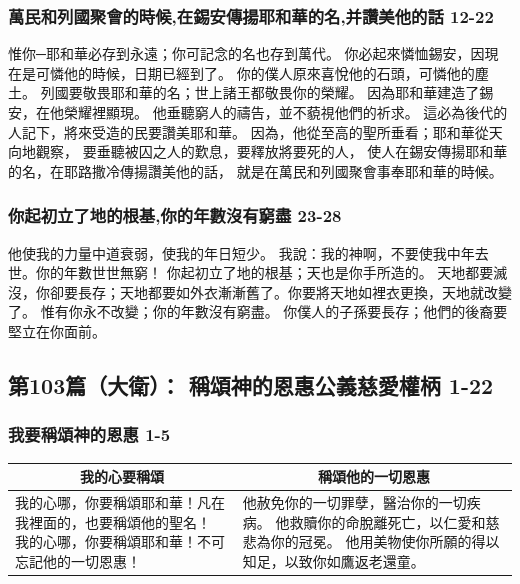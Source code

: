 \subsubsection{萬民和列國聚會的時候,在錫安傳揚耶和華的名,并讚美他的話 12-22}
惟你─耶和華必存到永遠；你可記念的名也存到萬代。
你必起來憐恤錫安，因現在是可憐他的時候，日期已經到了。
你的僕人原來喜悅他的石頭，可憐他的塵土。
列國要敬畏耶和華的名；世上諸王都敬畏你的榮耀。
因為耶和華建造了錫安，在他榮耀裡顯現。
他垂聽窮人的禱告，並不藐視他們的祈求。
這必為後代的人記下，將來受造的民要讚美耶和華。
因為，他從至高的聖所垂看；耶和華從天向地觀察，
要垂聽被囚之人的歎息，要釋放將要死的人，
使人在錫安傳揚耶和華的名，在耶路撒冷傳揚讚美他的話，
就是在萬民和列國聚會事奉耶和華的時候。
\subsubsection{你起初立了地的根基,你的年數沒有窮盡 23-28}
他使我的力量中道衰弱，使我的年日短少。
我說：我的神啊，不要使我中年去世。你的年數世世無窮！
你起初立了地的根基；天也是你手所造的。
天地都要滅沒，你卻要長存；天地都要如外衣漸漸舊了。你要將天地如裡衣更換，天地就改變了。
惟有你永不改變；你的年數沒有窮盡。
你僕人的子孫要長存；他們的後裔要堅立在你面前。

\subsection{第103篇（大衛）： 稱頌神的恩惠公義慈愛權柄 1-22}
\subsubsection{我要稱頌神的恩惠 1-5}
\begin{table}[H]
\centering
\begin{tabular}{p{7.25cm}|p{9.75cm}}\hline\hline
\multicolumn{1}{c|}{我的心要稱頌}&\multicolumn{1}{c}{稱頌他的一切恩惠}\\\hline
我的心哪，你要稱頌耶和華！凡在我裡面的，也要稱頌他的聖名！
我的心哪，你要稱頌耶和華！不可忘記他的一切恩惠！
&他赦免你的一切罪孽，醫治你的一切疾病。
他救贖你的命脫離死亡，以仁愛和慈悲為你的冠冕。
他用美物使你所願的得以知足，以致你如鷹返老還童。\\\hline
\end{tabular}
\end{table}

